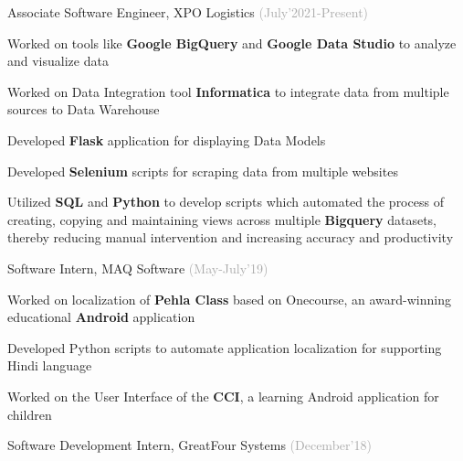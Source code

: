 \begin{cventries}
  \cventry
    {}
    {Associate Software Engineer, XPO Logistics}
    {\fontsize{9pt}{1em} \textcolor{darkgray}{(July'2021-Present)}}
    {}
    {
      {}
      \begin{cvitems}
        \item {Worked on tools like \textbf{Google BigQuery} and \textbf{Google Data Studio} to analyze and visualize data}
        \vspace{0.25mm}
        \item {Worked on Data Integration tool \textbf{Informatica} to integrate data from multiple sources to Data Warehouse}
        \vspace{0.25mm}
        \item {Developed \textbf{Flask} application for displaying Data Models} \vspace{0.25mm} 
        \item {Developed \textbf{Selenium} scripts for scraping data from multiple websites} \vspace{0.25mm}
        \item {Utilized \textbf{SQL} and \textbf{Python} to develop scripts which automated the process of creating, copying and maintaining views across multiple \textbf{Bigquery} datasets, thereby reducing manual intervention and increasing accuracy and productivity}\vspace{-1mm}
      \end{cvitems}
    }
    \cventry
    {}
    {Software Intern, MAQ Software}
    {\fontsize{9pt}{1em} \textcolor{darkgray}{(May-July'19)}}
    {}
    {
      {}
      \begin{cvitems}
        \item {Worked on localization of \textbf{Pehla Class} based on Onecourse, an award-winning educational \textbf{Android} application}
        \vspace{0.25mm}
        \item {Developed Python scripts to automate application localization for supporting Hindi language}
        \vspace{0.25mm}
        \item{Worked on the User Interface of the \textbf{CCI},  a learning Android application for children} \vspace{-1mm}
      \end{cvitems}
    }
  \cventry
    {}
    {Software Development Intern, GreatFour Systems}
    {\fontsize{9pt}{1em} \textcolor{darkgray}{(December'18)}}

\end{cventries}
